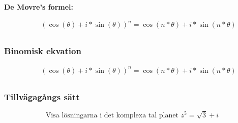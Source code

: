 \newpage

\textbf{De Movre's formel:}\par
\begin{align*}
  &\quad (\cos{(\theta)} + i * \sin{(\theta)})^{n} = \cos{(n*\theta)} + i * \sin{(n*\theta)} \\
\end{align*}


\subsubsection{Binomisk ekvation}
\begin{align*}
  &\quad (\cos{(\theta)} + i * \sin{(\theta)})^{n} = \cos{(n*\theta)} + i * \sin{(n*\theta)} \\
\end{align*}


\subsubsection{Tillvägagångs sätt}
\begin{equation}
  \text{Visa lösningarna i det komplexa tal planet } z^5 = \sqrt{3} + i
\end{equation}

